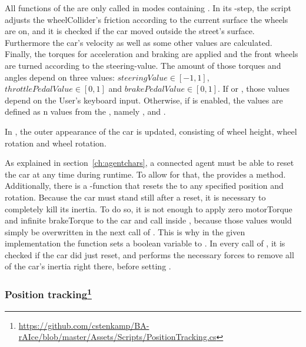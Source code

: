 All functions of the  are only called in modes containing . In its -step, the script adjusts the wheelCollider's friction according to the current surface the wheels are on, and it is checked if the car moved outside the street's surface. Furthermore the car's velocity as well as some other values are calculated. Finally, the torques for acceleration and braking are applied and the front wheels are turned according to the steering-value. The amount of those torques and angles depend on three values: $steeringValue \in [-1,1]$, $throttlePedalValue \in [0,1]$ and $brakePedalValue \in [0,1]$. If  or , those values depend on the User's keyboard input. Otherwise, if  is enabled, the values are defined as n values from the , namely ,  and .

In , the outer appearance of the car is updated, consisting of wheel height, wheel rotation and wheel rotation.

As explained in section~\ref{ch:agentchars}, a connected agent must be able to reset the car at any time during runtime. To allow for that, the  provides a  method. Additionally, there is a -function that resets the  to any specified position and rotation. Because the car must stand still after a reset, it is necessary to completely kill its inertia. To do so, it is not enough to apply zero motorTorque and infinite brakeTorque to the car and call  inside , because those values would simply be overwritten in the next call of . This is why in the given implementation the function  sets a boolean variable  to . In every call of , it is checked if the car did just reset, and performs the necessary forces to remove all of the car's inertia right there, before setting .



\subsubsection{Position tracking\footnote{\url{https://github.com/cstenkamp/BA-rAIce/blob/master/Assets/Scripts/PositionTracking.cs}}}

